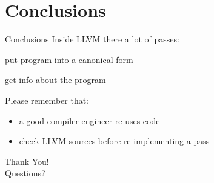 
\section{Conclusions}
\begin{frame}{Conclusions}
Inside LLVM there a lot of passes:

\begin{description}[normalization]
\item[normalization] put program into a canonical form
\item[analysis] get info about the program
\end{description}

\vfill
Please remember that:
\begin{itemize}
\item a good compiler engineer \alert{re-uses} code
\item check LLVM sources before re-implementing a pass
\end{itemize}
\vfill
\end{frame}


\begin{frame}[plain]{}
\Huge\centering
Thank You!\\
\bigskip
\normalsize
Questions?
\end{frame}

